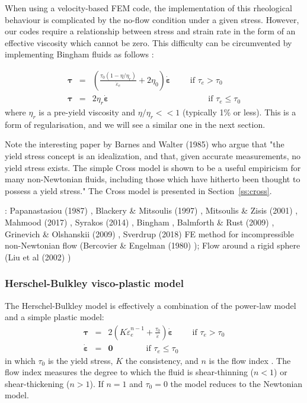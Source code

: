 When using a velocity-based FEM code, the implementation of this rheological behaviour 
is complicated by the no-flow condition under a given stress. However, our codes
require a relationship between stress and strain rate in the form of an effective viscosity
which cannot be zero. 
This difficulty can be circumvented by implementing Bingham fluids as follows \cite{reddybook2}:

\begin{eqnarray}
{\bm \tau} &=& \left(  \frac{\tau_0(1-\eta/\eta_r)}{\dot{\varepsilon}_e} 
+ 2 \eta_0  \right)\dot{\bm \varepsilon} \qquad \text{ if } \tau_{e}>\tau_0 \\
{\bm \tau} &=& 2 \eta_r \dot{\bm \varepsilon}  \qquad\qquad\qquad\qquad\qquad\qquad  
\text{if } \tau_{e} \leq \tau_0 
\end{eqnarray}
where $\eta_r$ is a pre-yield viscosity and $\eta/\eta_r<<1$ (typically 1\% or less). This is a form of 
regularisation, and we will see a similar one in the next section.

Note the interesting paper by Barnes and Walter (1985) \cite{bawa85} who argue that 
"the yield stress concept is an idealization, and that, given accurate
measurements, no yield stress exists. The simple Cross model is shown to be a
useful empiricism for many non-Newtonian fluids, including those which have
hitherto been thought to possess a yield stress." The Cross model is presented 
in Section~\ref{ss:cross}.
 

\Literature: 
Papanastasiou (1987) \cite{papa87}, Blackery \& Mitsoulis (1997) \cite{blmi97},
Mitsoulis \& Zisis (2001) \cite{mizi01}, Mahmood \etal (2017) \cite{maky17},
Syrakos \etal (2014) \cite{syga14}, Bingham \cite{bingham}, Balmforth \& Rust (2009) \cite{baru09}, 
Grinevich \& Olshanskii (2009) \cite{grol09}, Sverdrup \etal (2018) \cite{svna18}
FE method for incompressible non-Newtonian flow (Bercovier \& Engelman (1980) \cite{been80});
Flow around a rigid sphere (Liu et al (2002) \cite{limd02})

\subsubsection{Herschel-Bulkley visco-plastic model}

The Herschel-Bulkley model is effectively a combination of the power-law model and 
a simple plastic model:
\begin{eqnarray}
{\bm \tau} &=& 2 \left(  K \dot{\varepsilon}_e^{n-1} 
+ \frac{\tau_0}{\dot{\varepsilon}}\right)\dot{\bm \varepsilon} \qquad \text{ if } {\tau}_{e}>\tau_0 \\
\dot{\bm \varepsilon} &=& {\bm 0} \qquad\qquad \text{if }{\tau}_{e} \leq \tau_0 
\end{eqnarray}
in which $\tau_0$ is the yield stress, $K$ the consistency, and $n$ is the flow index  \cite{demj04}.
The flow index measures the degree to which the fluid is shear-thinning ($n<1$) or shear-thickening ($n>1$).
If $n=1$ and $\tau_0=0$ the model reduces to the Newtonian model. 

